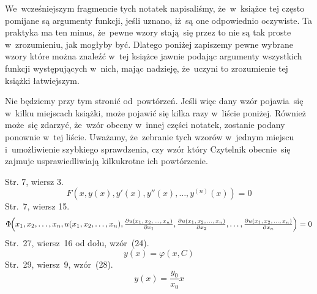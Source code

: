 \documentclass[a4paper,11pt]{article}
\numberwithin{equation}{section}
\begin{document}
\VerSpaceFour





\noindent
We~wcześniejszym fragmencie tych notatek napisaliśmy, że~w~książce tej
często pomijane są argumenty funkcji, jeśli uznano, iż~są one odpowiednio
oczywiste. Ta praktyka ma ten minus, że~pewne wzory stają~się przez to
nie są tak proste w~zrozumieniu, jak mogłyby być. Dlatego poniżej zapiszemy
pewne wybrane wzory które można znaleźć w~tej książce jawnie podając
argumenty wszystkich funkcji występujących w~nich, mając nadzieję,
że~uczyni to zrozumienie tej książki łatwiejszym.

Nie będziemy przy tym stronić od~powtórzeń. Jeśli więc dany wzór pojawia~się
w~kilku miejscach książki, może pojawić się kilka razy w~liście poniżej.
Również może~się zdarzyć, że~wzór obecny w~innej części notatek, zostanie
podany ponownie w~tej liście. Uważamy, że~zebranie tych wzorów w~jednym
miejscu i~umożliwienie szybkiego sprawdzenia, czy wzór który Czytelnik
obecnie~się zajmuje usprawiedliwiają kilkukrotne ich powtórzenie.

\VerSpaceTwo


\noindent
Str. 7, wiersz 3.
\begin{equation}
  \label{eq:Uwagi-ogolne-04}
  F\left( x, y( x ), y'( x ), y''( x ), \ldots, y^{ ( n ) }( x ) \right) = 0
\end{equation}
Str.~7, wiersz 15.
\begin{equation}
  \label{eq:Uwagi-ogolne-05}
  \Phi \hspace{-0.25em} \left( x_{ 1 }, x_{ 2 }, \ldots, x_{ n },
    u( x_{ 1 }, x_{ 2 }, \ldots, x_{ n }),
    \tfrac{ \partial u( x_{ 1 }, \, x_{ 2 }, \, \ldots, \, x_{ n } ) }{ \partial x_{ 1 } },
    \tfrac{ \partial u( x_{ 1 }, \, x_{ 2 }, \, \ldots, \, x_{ n } ) }{ \partial x_{ 2 } }, \ldots,
    \tfrac{ \partial u( x_{ 1 }, \, x_{ 2 }, \, \ldots, \, x_{ n } ) }{ \partial x_{ n } }
  \right) = 0
\end{equation}
Str.~27, wiersz~16 od dołu, wzór~(24).
\begin{equation}
  \label{eq:Uwagi-ogolne-06}
  y( x ) = \varphi( x, C )
\end{equation}
Str.~29, wiersz~9, wzór~(28).
\begin{equation}
  \label{eq:Uwagi-ogolne-07}
  y( x ) = \frac{ y_{ 0 } }{ x_{ 0 } } x
\end{equation}
\end{document}
